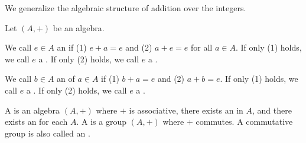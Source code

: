 
\sbasic



\sstart



We generalize the algebraic structure of addition over the integers.


Let $(A, +)$ be an algebra.

We call $e \in A$ an 
if (1) $e + a = e$ and (2) $a + e = e$ for all $a \in A$.
If only (1) holds, we call $e$ a
.
If only (2) holds, we call $e$ a
.

We call $b \in A$ an 
of $a \in A$ if (1) $b + a = e$ and (2) $a + b = e$.
If only (1) holds, we call $e$ a
.
If only (2) holds, we call $e$ a
.

A  is an algebra $(A, +)$ where
$+$ is associative,
there exists an 
in $A$, and there exists an  for
each  $A$.
A  is a group
$(A, +)$ where $+$ commutes.
A commutative group is also called an
.



\strats
